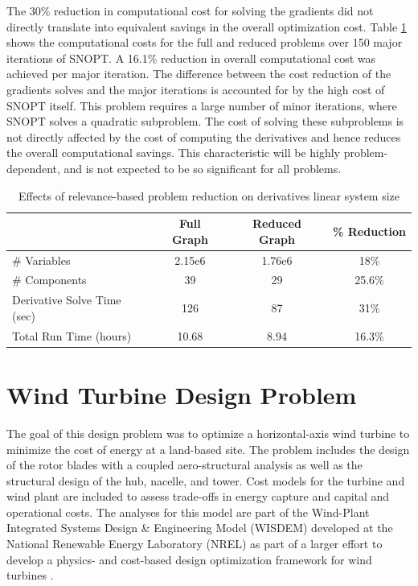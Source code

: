 \documentclass[]{aiaa-tc} %
\begin{document}
            The 30\% reduction in computational cost for solving the gradients did not directly translate into
            equivalent savings in the overall optimization cost. Table \ref{tab:cadre-relevance-reduction}
            shows the computational costs for the full and reduced problems over 150 major iterations of SNOPT.
            A 16.1\% reduction in overall computational cost was achieved per major iteration. The difference between
            the cost reduction of the gradients solves and the major iterations is accounted for by the high cost of
            SNOPT itself. This problem requires a large number of minor iterations, where SNOPT solves a quadratic subproblem.
            The cost of solving these subproblems is not directly affected by the cost of computing the derivatives and hence
            reduces the overall computational savings. This characteristic will be highly problem-dependent, and is not expected
            to be so significant for all problems.

            \begin{table}
                \centering
                \caption{Effects of relevance-based problem reduction on derivatives linear system size}
                  \begin{tabular}{l c c c}
                      \toprule
                                   & Full Graph & Reduced Graph & \% Reduction\\
                      \midrule
                      \# Variables  & 2.15e6 & 1.76e6 & 18\%\\ 
                      \# Components & 39 & 29 & 25.6\%\\ 
                      Derivative Solve Time (sec) & 126 & 87 & 31\%\\ 
                      Total Run Time (hours) & 10.68 & 8.94 & 16.3\%\\ 
                      \bottomrule
                  \end{tabular}    
                \label{tab:cadre-relevance-reduction}
            \end{table}




  \section{Wind Turbine Design Problem}

    The goal of this design problem was to optimize a horizontal-axis wind turbine to minimize
    the cost of energy at a land-based site. The problem includes the design of the rotor blades
    with a coupled aero-structural analysis as well as the structural design of the hub, nacelle,
    and tower.  Cost models for the turbine and wind plant are included
    to assess trade-offs in energy capture and capital and operational costs.  The analyses
    for this model are part of the Wind-Plant Integrated Systems Design \& Engineering Model (WISDEM)
    developed at the National Renewable Energy Laboratory (NREL) as part of a larger effort
    to develop a physics- and cost-based design optimization framework for wind turbines  \cite{Dykes2014a,Ning2013a,Ning2014,Ning2014d}.
\end{document}
